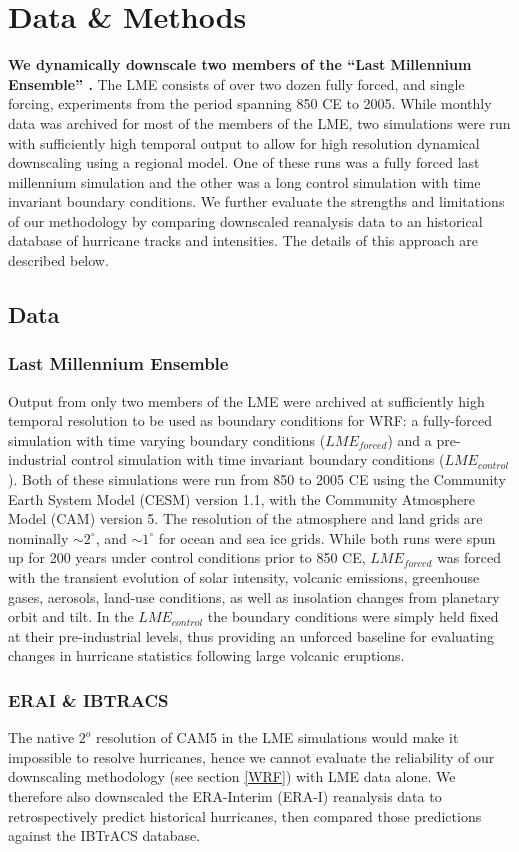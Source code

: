 \documentclass[phd,tocprelim]{cornell}
\begin{document}
\section{Data \& Methods}
\label{methods}
\textbf{We dynamically downscale two members of the ``Last Millennium
  Ensemble'' \cite{gcm_lme}.} The LME consists of over two dozen
fully forced, and single forcing, experiments from the period spanning
850 CE to 2005. While monthly data was archived for most of the
members of the LME, two simulations were run with sufficiently high
temporal output to allow for high resolution dynamical downscaling
using a regional model. One of these runs was a fully forced last
millennium simulation and the other was a long control simulation with
time invariant boundary conditions. We further evaluate the strengths
and limitations of our methodology by comparing downscaled reanalysis
data to an historical database of hurricane tracks and
intensities. The details of this approach are described below.

\subsection{Data}
\subsubsection{Last Millennium Ensemble}
Output from only two members of the LME were archived at sufficiently
high temporal resolution to be used as boundary conditions for WRF: a
fully-forced simulation with time varying boundary conditions
($LME_{forced}$) and a pre-industrial control simulation with time
invariant boundary conditions ($LME_{control}$). Both of these
simulations were run from 850 to 2005 CE using the Community Earth
System Model (CESM) version 1.1, with the Community Atmosphere Model
(CAM) version 5. The resolution of the atmosphere and land grids are
nominally ${\sim}2^\circ$, and ${\sim}1^\circ$ for ocean and sea ice
grids. While both runs were spun up for 200 years under control
conditions prior to 850 CE, $LME_{forced}$ was forced with the
transient evolution of solar intensity, volcanic emissions, greenhouse
gases, aerosols, land-use conditions, as well as insolation changes
from planetary orbit and tilt. In the $LME_{control}$ the boundary
conditions were simply held fixed at their pre-industrial levels, thus
providing an unforced baseline for evaluating changes
in hurricane statistics following large volcanic eruptions.

\subsubsection{ERAI \& IBTRACS}
The native $2^o$ resolution of CAM5 in the LME simulations would make
it impossible to resolve hurricanes, hence we cannot evaluate the
reliability of our downscaling methodology (see section \ref{WRF}) with LME
data alone. We therefore also downscaled the ERA-Interim (ERA-I)
\cite{erai_reanal} reanalysis data to retrospectively predict historical
hurricanes, then compared those predictions against the IBTrACS
\cite{ibtracs} database.
\end{document}
